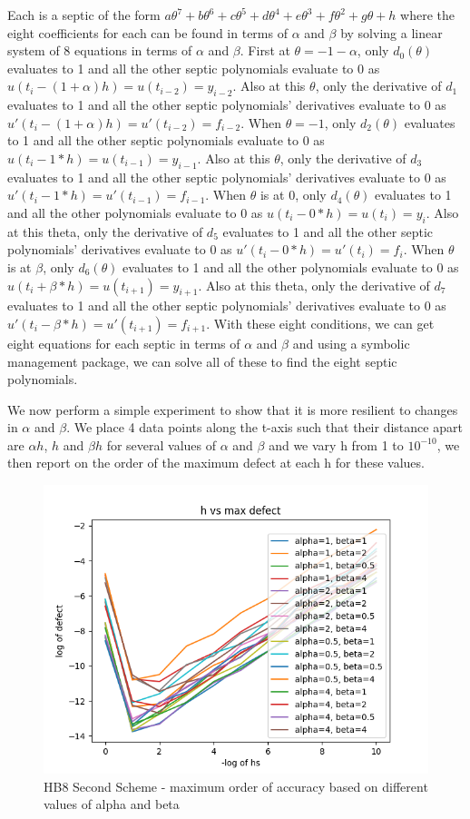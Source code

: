 \documentclass{article}
\begin{document}
Each is a septic of the form $a\theta^7 + b\theta^6 + c\theta^5 + d\theta^4 + e\theta^3 + f\theta^2 + g\theta + h$ where the eight coefficients for each can be found in terms of $\alpha$ and $\beta$ by solving a linear system of 8 equations in terms of $\alpha$ and $\beta$. First at $\theta = -1-\alpha$, only $d_0(\theta)$ evaluates to 1 and all the other septic polynomials evaluate to 0 as $u(t_i - (1+\alpha) h) = u(t_{i - 2}) = y_{i - 2}$. Also at this $\theta$, only the derivative of $d_1$ evaluates to 1 and all the other septic polynomials' derivatives evaluate to 0 as $u'(t_i - (1+\alpha) h) = u'(t_{i - 2}) = f_{i - 2}$. When $\theta = -1$, only $d_2(\theta)$ evaluates to 1 and all the other septic polynomials evaluate to 0 as $u(t_i - 1*h) = u(t_{i - 1}) = y_{i - 1}$. Also at this $\theta$, only the derivative of $d_3$ evaluates to 1 and all the other septic polynomials' derivatives evaluate to 0 as $u'(t_i - 1*h) = u'(t_{i - 1}) = f_{i - 1}$. When $\theta$ is at 0, only $d_4(\theta)$ evaluates to 1 and all the other polynomials evaluate to 0 as $u(t_i - 0*h) = u(t_i) = y_i$. Also at this theta, only the derivative of $d_5$ evaluates to 1 and all the other septic polynomials' derivatives evaluate to 0 as $u'(t_i - 0*h) = u'(t_i) = f_i$. When $\theta$ is at $\beta$, only $d_6(\theta)$ evaluates to 1 and all the other polynomials evaluate to 0 as $u(t_i + \beta*h) = u(t_{i+1}) = y_{i+1}$. Also at this theta, only the derivative of $d_7$ evaluates to 1 and all the other septic polynomials' derivatives evaluate to 0 as $u'(t_i - \beta*h) = u'(t_{i+1}) = f_{i+1}$. With these eight conditions, we can get eight equations for each septic in terms of $\alpha$ and $\beta$ and using a symbolic management package, we can solve all of these to find the eight septic polynomials.

We now perform a simple experiment to show that it is more resilient to changes in $\alpha$ and $\beta$. We place 4 data points along the t-axis such that their distance apart are $\alpha h$, $h$ and $\beta h$ for several values of $\alpha$ and $\beta$ and we vary h from 1 to $10^{-10}$, we then report on the order of the maximum defect at each h for these values.

\begin{figure}[H]
\centering
\includegraphics[width=0.7\linewidth]{./figures/hb8_second_scheme_alpha_beta_test}
\caption{HB8 Second Scheme - maximum order of accuracy based on different values of alpha and beta}
\label{fig:hb8_second_scheme_alpha_beta_test}
\end{figure}
\end{document}

